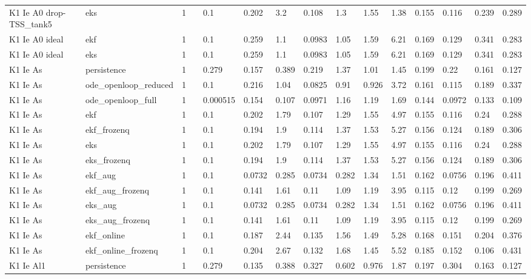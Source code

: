 \begin{table}[t]
\begin{tabular}{lllllllllllllll}
K1 Ie A0 drop-TSS\_tank5 & eks & 1 &  & 0.1 & 0.202 & 3.2 & 0.108 & 1.3 & 1.55 & 1.38 & 0.155 & 0.116 & 0.239 & 0.289 \\
K1 Ie A0 ideal & ekf & 1 &  & 0.1 & 0.259 & 1.1 & 0.0983 & 1.05 & 1.59 & 6.21 & 0.169 & 0.129 & 0.341 & 0.283 \\
K1 Ie A0 ideal & eks & 1 &  & 0.1 & 0.259 & 1.1 & 0.0983 & 1.05 & 1.59 & 6.21 & 0.169 & 0.129 & 0.341 & 0.283 \\
K1 Ie As & persistence & 1 &  & 0.279 & 0.157 & 0.389 & 0.219 & 1.37 & 1.01 & 1.45 & 0.199 & 0.22 & 0.161 & 0.127 \\
K1 Ie As & ode\_openloop\_reduced & 1 &  & 0.1 & 0.216 & 1.04 & 0.0825 & 0.91 & 0.926 & 3.72 & 0.161 & 0.115 & 0.189 & 0.337 \\
K1 Ie As & ode\_openloop\_full & 1 &  & 0.000515 & 0.154 & 0.107 & 0.0971 & 1.16 & 1.19 & 1.69 & 0.144 & 0.0972 & 0.133 & 0.109 \\
K1 Ie As & ekf & 1 &  & 0.1 & 0.202 & 1.79 & 0.107 & 1.29 & 1.55 & 4.97 & 0.155 & 0.116 & 0.24 & 0.288 \\
K1 Ie As & ekf\_frozenq & 1 &  & 0.1 & 0.194 & 1.9 & 0.114 & 1.37 & 1.53 & 5.27 & 0.156 & 0.124 & 0.189 & 0.306 \\
K1 Ie As & eks & 1 &  & 0.1 & 0.202 & 1.79 & 0.107 & 1.29 & 1.55 & 4.97 & 0.155 & 0.116 & 0.24 & 0.288 \\
K1 Ie As & eks\_frozenq & 1 &  & 0.1 & 0.194 & 1.9 & 0.114 & 1.37 & 1.53 & 5.27 & 0.156 & 0.124 & 0.189 & 0.306 \\
K1 Ie As & ekf\_aug & 1 &  & 0.1 & 0.0732 & 0.285 & 0.0734 & 0.282 & 1.34 & 1.51 & 0.162 & 0.0756 & 0.196 & 0.411 \\
K1 Ie As & ekf\_aug\_frozenq & 1 &  & 0.1 & 0.141 & 1.61 & 0.11 & 1.09 & 1.19 & 3.95 & 0.115 & 0.12 & 0.199 & 0.269 \\
K1 Ie As & eks\_aug & 1 &  & 0.1 & 0.0732 & 0.285 & 0.0734 & 0.282 & 1.34 & 1.51 & 0.162 & 0.0756 & 0.196 & 0.411 \\
K1 Ie As & eks\_aug\_frozenq & 1 &  & 0.1 & 0.141 & 1.61 & 0.11 & 1.09 & 1.19 & 3.95 & 0.115 & 0.12 & 0.199 & 0.269 \\
K1 Ie As & ekf\_online & 1 &  & 0.1 & 0.187 & 2.44 & 0.135 & 1.56 & 1.49 & 5.28 & 0.168 & 0.151 & 0.204 & 0.376 \\
K1 Ie As & ekf\_online\_frozenq & 1 &  & 0.1 & 0.204 & 2.67 & 0.132 & 1.68 & 1.45 & 5.52 & 0.185 & 0.152 & 0.106 & 0.431 \\
K1 Ie Al1 & persistence & 1 &  & 0.279 & 0.135 & 0.388 & 0.327 & 0.602 & 0.976 & 1.87 & 0.197 & 0.304 & 0.163 & 0.127 \\

\end{tabular}
\end{table}
